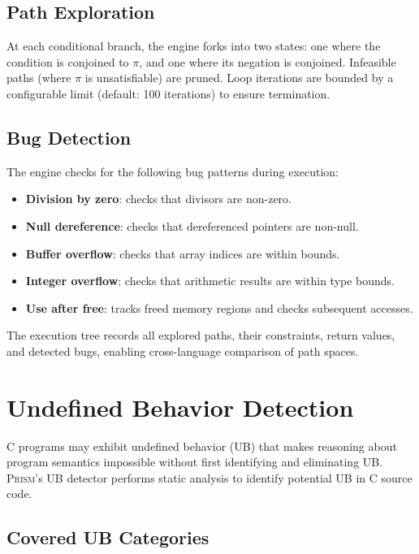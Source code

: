 \documentclass[11pt,a4paper]{article}
\begin{document}
\subsection{Path Exploration}

At each conditional branch, the engine forks into two states:
one where the condition is conjoined to $\pi$, and one where its
negation is conjoined. Infeasible paths (where $\pi$ is unsatisfiable)
are pruned. Loop iterations are bounded by a configurable limit
(default: 100 iterations) to ensure termination.

\subsection{Bug Detection}

The engine checks for the following bug patterns during execution:
\begin{itemize}
  \item \textbf{Division by zero}: checks that divisors are non-zero.
  \item \textbf{Null dereference}: checks that dereferenced pointers
    are non-null.
  \item \textbf{Buffer overflow}: checks that array indices are within
    bounds.
  \item \textbf{Integer overflow}: checks that arithmetic results are
    within type bounds.
  \item \textbf{Use after free}: tracks freed memory regions and
    checks subsequent accesses.
\end{itemize}

The execution tree records all explored paths, their constraints,
return values, and detected bugs, enabling cross-language comparison
of path spaces.


\section{Undefined Behavior Detection}\label{sec:ub}

C programs may exhibit undefined behavior (UB) that makes reasoning
about program semantics impossible without first identifying and
eliminating UB. \textsc{Prism}'s UB detector performs static analysis
to identify potential UB in C source code.

\subsection{Covered UB Categories}
\end{document}
